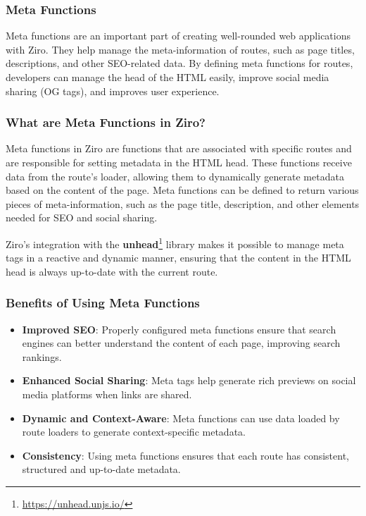 \subsubsection{Meta Functions}
Meta functions are an important part of creating well-rounded web applications with Ziro. They help manage the meta-information of routes, such as page titles, descriptions, and other SEO-related data. By defining meta functions for routes, developers can manage the head of the HTML easily, improve social media sharing (OG tags), and improves user experience.

\subsubsection*{What are Meta Functions in Ziro?}
Meta functions in Ziro are functions that are associated with specific routes and are responsible for setting metadata in the HTML head. These functions receive data from the route’s loader, allowing them to dynamically generate metadata based on the content of the page. Meta functions can be defined to return various pieces of meta-information, such as the page title, description, and other elements needed for SEO and social sharing.

Ziro’s integration with the \textbf{unhead}\footnote{\url{https://unhead.unjs.io/}} library makes it possible to manage meta tags in a reactive and dynamic manner, ensuring that the content in the HTML head is always up-to-date with the current route.


\subsubsection*{Benefits of Using Meta Functions}
\begin{itemize}
  \item \textbf{Improved SEO}: Properly configured meta functions ensure that search engines can better understand the content of each page, improving search rankings.

  \item \textbf{Enhanced Social Sharing}: Meta tags help generate rich previews on social media platforms when links are shared.

  \item \textbf{Dynamic and Context-Aware}: Meta functions can use data loaded by route loaders to generate context-specific metadata.

  \item \textbf{Consistency}: Using meta functions ensures that each route has consistent, structured and up-to-date metadata.
\end{itemize}

